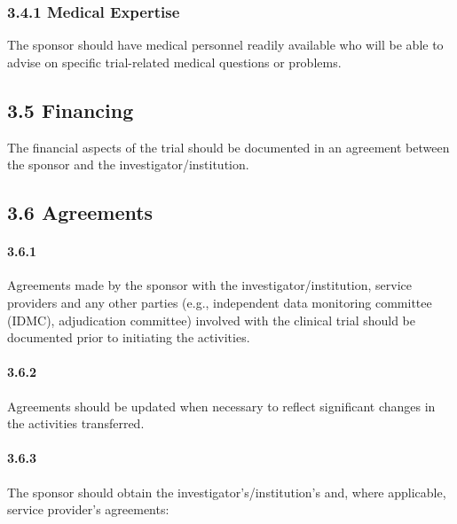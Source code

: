 \documentclass[11pt]{article}
\begin{document}
\subsubsection{3.4.1 Medical Expertise}

The sponsor should have medical personnel readily available who will be able to advise on specific trial-related medical questions or problems.


\subsection{3.5 Financing}

The financial aspects of the trial should be documented in an agreement between the sponsor and the investigator/institution.


\subsection{3.6 Agreements}

\paragraph{3.6.1} Agreements made by the sponsor with the investigator/institution, service providers and any other parties (e.g., independent data monitoring committee (IDMC), adjudication committee) involved with the clinical trial should be documented prior to initiating the activities.

\paragraph{3.6.2} Agreements should be updated when necessary to reflect significant changes in the activities transferred.

\paragraph{3.6.3} The sponsor should obtain the investigator's/institution's and, where applicable, service provider's agreements:
\end{document}
